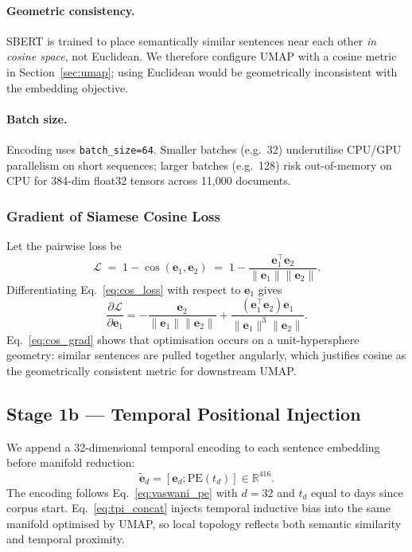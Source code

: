 \documentclass[10pt,twocolumn,a4paper]{article}
\newcommand{\R}{\mathbb{R}}
\begin{document}
\paragraph{Geometric consistency.} SBERT is trained to place semantically similar sentences near each other \emph{in cosine space}, not Euclidean. We therefore configure UMAP with a cosine metric in Section~\ref{sec:umap}; using Euclidean would be geometrically inconsistent with the embedding objective.

\paragraph{Batch size.} Encoding uses \texttt{batch\_size=64}. Smaller batches (e.g.\ 32) underutilise CPU/GPU parallelism on short sequences; larger batches (e.g.\ 128) risk out-of-memory on CPU for 384-dim float32 tensors across 11{,}000 documents.

\subsubsection{Gradient of Siamese Cosine Loss}
\label{sec:cos_grad}

Let the pairwise loss be
\begin{equation}
\label{eq:cos_loss}
\mathcal{L} \;=\; 1 - \cos(\bm{e}_1,\bm{e}_2)
\;=\; 1 - \frac{\bm{e}_1^\top \bm{e}_2}{\|\bm{e}_1\|\|\bm{e}_2\|}.
\end{equation}
Differentiating Eq.~\eqref{eq:cos_loss} with respect to $\bm{e}_1$ gives
\begin{equation}
\label{eq:cos_grad}
\frac{\partial \mathcal{L}}{\partial \bm{e}_1}
= -\frac{\bm{e}_2}{\|\bm{e}_1\|\|\bm{e}_2\|}
+ \frac{(\bm{e}_1^\top \bm{e}_2)\bm{e}_1}{\|\bm{e}_1\|^3\|\bm{e}_2\|}.
\end{equation}
Eq.~\eqref{eq:cos_grad} shows that optimisation occurs on a unit-hypersphere geometry: similar sentences are pulled together angularly, which justifies cosine as the geometrically consistent metric for downstream UMAP.

\subsection{Stage 1b --- Temporal Positional Injection}
\label{sec:tpi}

We append a 32-dimensional temporal encoding to each sentence embedding before manifold reduction:
\begin{equation}
\label{eq:tpi_concat}
\tilde{\bm{e}}_d = [\bm{e}_d;\text{PE}(t_d)] \in \R^{416}.
\end{equation}
The encoding follows Eq.~\eqref{eq:vaswani_pe} with $d{=}32$ and $t_d$ equal to days since corpus start. Eq.~\eqref{eq:tpi_concat} injects temporal inductive bias into the same manifold optimised by UMAP, so local topology reflects both semantic similarity and temporal proximity.
\end{document}

